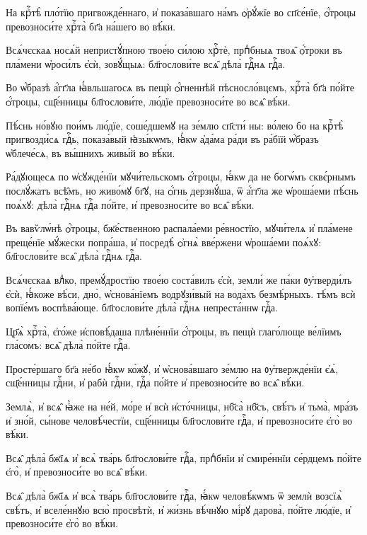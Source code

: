 \hKv На крⷭ҇тѣ̀ пло́тїю пригвожде́ннаго, и҆ показа́вшаго на́мъ  ѻ҆рꙋ́жїе во сп҃се́нїе, ѻ҆́троцы превозноси́те хрⷭ҇та̀ бг҃а  на́шего во вѣ́ки. 

\hKv Всѧ́чєскаѧ носѧ́й непристꙋ́пною твое́ю си́лою хрⷭ҇тѐ,  прпⷣбныѧ твоѧ̑ ѻ҆́троки въ пла́мени ѡ҆роси́лъ є҆сѝ,  зовꙋ́щыѧ: бл҃гослови́те всѧ̑ дѣла̀ гдⷭ҇нѧ гдⷭ҇а.  

\hKv Во ѡ҆́бразѣ а҆́гг҃ла ꙗ҆́вльшагосѧ въ пещѝ ѻ҆́гненнѣй  пѣсносло́вцємъ, хрⷭ҇та̀ бг҃а по́йте ѻ҆́троцы, сщ҃е́нницы  бл҃гослови́те, лю́дїе превозноси́те во всѧ̑ вѣ́ки. 

\hKv Пѣ́снь но́вꙋю пои́мъ лю́дїе, соше́дшемꙋ на зе́млю сп҃сти́  ны: во́лею бо на крⷭ҇тѣ̀ пригвозди́сѧ гдⷭ҇ь, показа́вый  ꙗ҆зы́кѡмъ, ꙗ҆́кѡ а҆да́ма ра́ди въ ра́бїй ѡ҆́бразъ  ѡ҆блече́сѧ, въ вы́шнихъ живы́й во вѣ́ки.

\hKv Ра́дꙋющесѧ по ѡ҆сꙋжде́нїи мꙋчи́тельскомъ ѻ҆́троцы, ꙗ҆́кѡ  да не богѡ́мъ сквє́рнымъ послꙋ́жатъ всѣ̑мъ, но живо́мꙋ  бг҃ꙋ, на ѻ҆́гнь дерзнꙋ́ша, ѿ а҆́гг҃ла же ѡ҆роша́еми  пѣ́снь поѧ́хꙋ: дѣла̀ гдⷭ҇нѧ гдⷭ҇а по́йте, и҆ превозноси́те  во всѧ̑ вѣ́ки. 
%

\hKv Въ вавѷлѡ́нѣ ѻ҆́троцы, бж҃е́ственною  распала́еми ре́вностїю, мꙋчи́телѧ и҆ пла́мене преще́нїе  мꙋ́жески попра́ша, и҆ посредѣ̀ ѻ҆гнѧ̀ вве́ржени ѡ҆роша́еми  поѧ́хꙋ: бл҃гослови́те всѧ̑ дѣла̀ гдⷭ҇нѧ гдⷭ҇а.  

\hKv Всѧ́чєскаѧ влⷣко, премꙋ́дростїю твое́ю соста́вилъ є҆сѝ,  земли́ же па́ки ᲂу҆тверди́лъ є҆сѝ, ꙗ҆́коже вѣ́си, дно̀,  ѡ҆снова́нїемъ водрꙋзи́вый на вода́хъ безмѣ́рныхъ. тѣ́мъ  всѝ вопїе́мъ воспѣва́юще. бл҃гослови́те дѣла̀ гдⷭ҇нѧ  непреста́ннѡ гдⷭ҇а. 

\hKv Цр҃ѧ̀ хрⷭ҇та̀, є҆го́же и҆сповѣ́даша плѣне́ннїи ѻ҆́троцы,  въ пещѝ глаго́люще ве́лїимъ гла́сомъ: всѧ̑ дѣла̀ по́йте  гдⷭ҇а. 

\hKv Просте́ршаго бг҃а не́бо ꙗ҆́кѡ ко́жꙋ, и҆ ѡ҆снова́вшаго  зе́млю на ᲂу҆твержде́нїи є҆ѧ̀, сщ҃е́нницы гдⷭ҇ни, и҆ рабѝ  гдⷭ҇ни, гдⷭ҇а по́йте и҆ превозноси́те во всѧ̑ вѣ́ки. 

\hKv Землѧ̀, и҆ всѧ̑ ꙗ҆̀же на не́й, мо́ре и҆ всѝ и҆сто́чницы,  нб҃са̀ нб҃съ, свѣ́тъ и҆ тьма̀, мра́зъ и҆ зно́й, сы́нове  человѣ́честїи, сщ҃е́нницы бл҃гослови́те гдⷭ҇а, и҆  превозноси́те є҆го̀ во вѣ́ки. 

\hKv Всѧ̑ дѣла̀ бж҃їѧ и҆ всѧ̀ тва́рь бл҃гослови́те гдⷭ҇а,  прпⷣбнїи и҆ смире́ннїи се́рдцемъ по́йте є҆го̀, и҆  превозноси́те во всѧ̑ вѣ́ки.  

\hKv Всѧ̑ дѣла̀ бж҃їѧ и҆ всѧ̀ тва́рь бл҃гослови́те гдⷭ҇а, ꙗ҆́кѡ  человѣ́кѡмъ ѿ землѝ возсїѧ̀ свѣ́тъ, и҆ вселе́ннꙋю всю̀  просвѣтѝ, и҆ жи́знь вѣ́чнꙋю мі́рꙋ дарова̀, по́йте лю́дїе,  и҆ превозноси́те є҆го̀ во вѣ́ки. 

